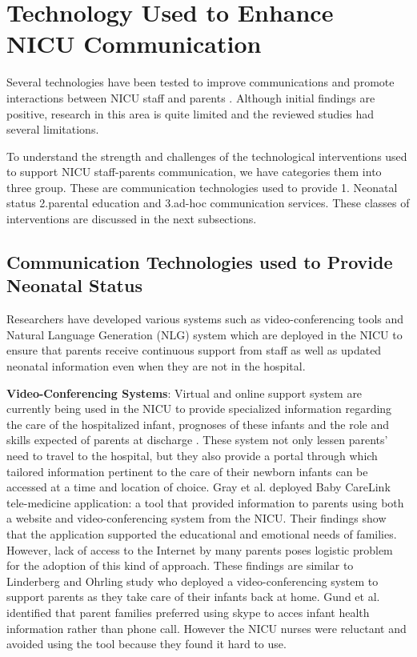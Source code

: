 \section{Technology Used to Enhance NICU Communication} 
Several technologies have been tested to improve communications and promote interactions between NICU staff and parents \citep{Hayes2014, Doron2013, Gray2000a, Globus2016, Mahamood2011, Weems2016}. Although initial findings are positive, research in this area is quite limited and the reviewed studies had several limitations. 

To understand the strength and challenges of the technological interventions used to support NICU staff-parents communication, we have categories them into three group. These are communication technologies used to provide 1. Neonatal status 2.parental education and 3.ad-hoc communication services. These classes of interventions are discussed in the next subsections.
\subsection{Communication Technologies used to Provide Neonatal Status}
Researchers have developed various systems  such as video-conferencing tools and Natural Language Generation (NLG) system which are deployed in the NICU to ensure that parents receive continuous support from staff  as well as updated  neonatal information even when they are not in the hospital. 

\textbf{Video-Conferencing Systems}: Virtual and online support system are currently being used in the NICU to provide specialized information regarding the care of the hospitalized infant, prognoses of these infants and the role and skills expected of parents at discharge \citep{Joshi2016, Luu2017, Yang2014}. These system not only  lessen parents' need to travel to the hospital, but they also provide a portal through which tailored information pertinent to the care of their newborn infants can be accessed at a time and location of choice. Gray et al. \citep{Gray2000a} deployed Baby CareLink tele-medicine application: a tool that provided information to parents using  both a website and video-conferencing system from the NICU. Their findings show that the application supported the educational and emotional needs of families. However, lack of access to the Internet by many parents poses logistic problem for the adoption of this kind of approach. These findings are similar to Linderberg and Ohrling \citep{Lindberg2012a} study who deployed a video-conferencing system to support parents as they take care of their infants back at home. Gund et al. \citep{Gund2013} identified that parent families preferred using skype  to acces infant health information rather than phone call. However the NICU nurses were reluctant and avoided using the tool because they found it hard to use. 

